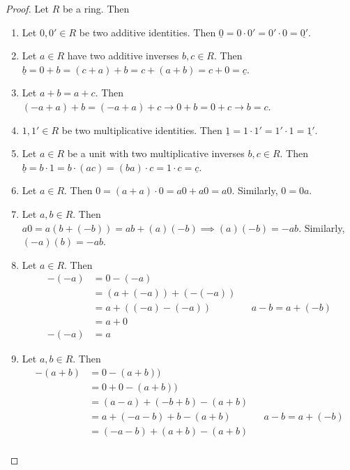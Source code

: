 \documentclass [12pt] {article}
\newcommand{\ul}[1]{\underline{{#1}}}
\begin{document}
\begin{proof}
    Let $R$ be a ring. Then
    \begin{enumerate}[label=(\arabic*)]
        \item Let $0, 0' \in R$ be two additive identities. Then 
            $\ul{0} = 0 \cdot 0' = 0' \cdot 0 = \ul{0'}$.
        \item Let $a \in R$ have two additive inverses $b, c \in R$. Then
            \newline
            $\ul{b} = 0 + b = (c + a) + b = c + (a + b) = c + 0 = \ul{c}$.
        \item Let $a + b = a + c$. Then $(-a + a) + b = (-a + a) + c \to 0 + b = 0 + c \to b = c$.
        \item $1, 1' \in R$ be two multiplicative identities. Then
            $\ul{1} = 1 \cdot 1' = 1' \cdot 1 = \ul{1'}$.
        \item Let $a \in R$ be a unit with two multiplicative inverses $b, c \in R$. Then
            \newline
            $\ul{b} = b \cdot 1 = b \cdot (ac) = (ba) \cdot c = 1 \cdot c = \ul{c}$.
        \item Let $a \in R$. Then $0 = (a + a) \cdot 0 = a0 + a0 = a0$. Similarly, $0 = 0a$.
        \item Let $a, b \in R$. Then $a0 = a(b + (-b)) = ab + (a)(-b) \implies (a)(-b) = -ab$.
            Similarly, $(-a)(b) = -ab$.
        \item Let $a \in R$. Then 
            \begin{align*}
                -(-a) &= 0 - (-a) \\
                      &= (a + (-a)) + (-(-a)) \\
                      &= a + ((-a) - (-a)) && a - b = a + (-b) \\
                      &= a + 0 \\
                -(-a) &= a
            \end{align*}
        \item Let $a, b \in R$. Then
            \begin{align*}
                -(a + b) &= 0 - (a + b)) \\
                         &= 0 + 0 - (a + b)) \\
                         &= (a - a) + (-b + b) - (a + b) \\
                         &= a + (-a - b) + b - (a + b) && a - b = a + (-b) \\
                         &= (-a - b) + (a + b) - (a + b) \\

\end{align*}
\end{enumerate}
\end{proof}
\end{document}
